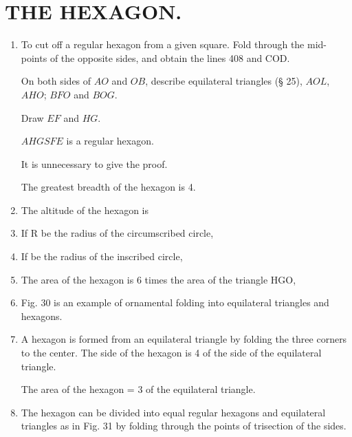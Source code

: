 
\chapter{THE HEXAGON.}


\begin{enumerate}

\item To cut off a regular hexagon from a given square.  Fold through the
    mid-points of the opposite sides, and obtain the lines 408 and COD.


    On both sides of $AO$ and $OB$, describe equilateral triangles (§ 25),
    $AOL$, $AHO$; $BFO$ and $BOG$.

    Draw $EF$ and $HG$.

    $AHGSFE$ is a regular hexagon.

    It is unnecessary to give the proof.

    The greatest breadth of the hexagon is 4.


\item The altitude of the hexagon is
%
%
%
%
%

\item If R be the radius of the circumscribed circle,


%

\item If be the radius of the inscribed circle,




\item The area of the hexagon is 6 times the area of the triangle HGO,








\item Fig. 30 is an example of ornamental folding into equilateral triangles and
    hexagons.

\item A hexagon is formed from an equilateral triangle by folding the three
    corners to the center.  The side of the hexagon is 4 of the side of the
    equilateral triangle.

    The area of the hexagon = 3 of the equilateral triangle.

\item The hexagon can be divided into equal regular hexagons and equilateral
    triangles as in Fig. 31 by folding through the points of trisection of the
    sides.

\end{enumerate}

